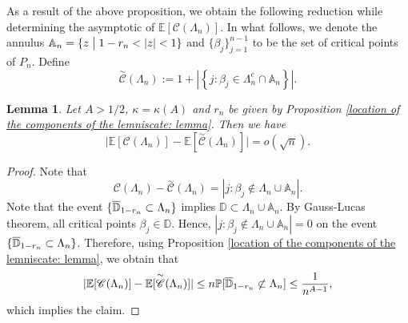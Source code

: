 \documentclass[9pt,a4paper,reqno]{amsart}
\newcommand{\tildea}[1]{\overset{\sim}{#1}}
\theoremstyle{mine}
\newtheorem{Lemma}[thm]{Lemma}
\theoremstyle{definition}
\theoremstyle{remark}
\newcommand{\mb}{\mathbb}
\begin{document}
    
As a result of the above proposition, we obtain the following reduction while determining the asymptotic of $\mb{E}[\mathscr{C}(\Lambda_n)]$. In what follows, we denote the annulus $ \mb{A}_n = \{ z  \hspace{1mm}\bigl| \hspace{1mm} 1 - r_n<|z| <1\}$ and $\{\beta_j\}_{j=1}^{n-1}$ to be the set of critical points of $P_n$. Define
\begin{equation}\label{def-tilde-for-C}
\tildea{\mathscr{C}}(\Lambda_n) := 1 + \left|\left\{ j: \beta_j \in \Lambda_n^c \cap \mb{A}_n \right \}\right|.
\end{equation} 
 

\begin{Lemma}\label{tilde-C} Let $A> 1/2$, $\kappa = \kappa(A)$ and $r_n$ be given by Proposition \ref{location of the components of the lemniscate: lemma}. Then we have 
 \[ \Big|\mb{E}[\mathscr{C}(\Lambda_n)]  -  \mb{E}[\tildea{\mathscr{C}}(\Lambda_n)] \Big| = o(\sqrt{n}).\]
\end{Lemma}

\begin{proof}
Note that 
\[ \mathscr{C}(\Lambda_n) - \tildea{\mathscr{C}}(\Lambda_n) = |j : \beta_j \notin \Lambda_n \cup \mb{A}_n|.\]
Note that the event $\{ \overline{\mb{D}}_{1-r_n} \vspace{.05in} \subset \vspace{.05in} \Lambda_n\}$ implies $\mb{D} \subset \Lambda_n \cup \mb{A}_n$. By Gauss-Lucas theorem, all critical points $\beta_j \in \mb{D}$. Hence, $|j : \beta_j \notin \Lambda_n \cup \mb{A}_n| = 0$ on the event $\{ \overline{\mb{D}}_{1-r_n} \vspace{.05in} \subset \vspace{.05in} \Lambda_n\}$. Therefore, using Proposition \ref{location of the components of the lemniscate: lemma}, we obtain that  
\[ |\mb{E}[\mathscr{C}(\Lambda_n)]  -  \mb{E}[\tildea{\mathscr{C}}(\Lambda_n)] | \leq n \mb{P}[\overline{\mb{D}}_{1-r_n} \vspace{.05in} \not\subset \vspace{.05in} \Lambda_n] \leq \frac{1}{n^{A-1}},\]
which implies the claim. 
\end{proof}
\end{document}
